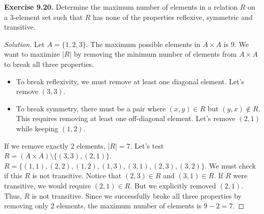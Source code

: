 \documentclass[11pt, a4paper]{article}
\theoremstyle{definition}
\theoremstyle{remark}
\begin{document}
\vspace{1em}
\textbf{Exercise 9.20.} Determine the maximum number of elements in a relation $R$ on a 3-element set such that $R$ has none of the properties reflexive, symmetric and transitive.
\begin{proof}[Solution]
Let $A = \{1, 2, 3\}$. The maximum possible elements in $A \times A$ is 9. We want to maximize $|R|$ by removing the minimum number of elements from $A \times A$ to break all three properties.
\begin{itemize}
    \item To break reflexivity, we must remove at least one diagonal element. Let's remove $(3,3)$.
    \item To break symmetry, there must be a pair where $(x,y) \in R$ but $(y,x) \notin R$. This requires removing at least one off-diagonal element. Let's remove $(2,1)$ while keeping $(1,2)$.
\end{itemize}
If we remove exactly 2 elements, $|R| = 7$. Let's test $R = (A \times A) \setminus \{(3,3), (2,1)\}$.
$R = \{(1,1), (2,2), (1,2), (1,3), (3,1), (2,3), (3,2)\}$.
We must check if this $R$ is not transitive. 
Notice that $(2,3) \in R$ and $(3,1) \in R$. If $R$ were transitive, we would require $(2,1) \in R$. But we explicitly removed $(2,1)$. Thus, $R$ is not transitive.
Since we successfully broke all three properties by removing only 2 elements, the maximum number of elements is $9 - 2 = 7$.
\end{proof}
\end{document}
